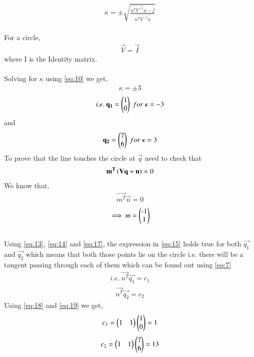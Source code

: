 \documentclass[journal,12pt,twocolumn]{IEEEtran}
\begin{document}
\begin{align}
\kappa = \pm \sqrt{\frac{\vec{u^TV^{-1}u}-f}{\vec{n^TV^{-1}n}}} \label{eq:10}
\end{align}\\
For a circle,
\begin{align}
\vec{V} = \vec{I} \label{eq:11}
\end{align}
where I is the Identity matrix.\\\\
Solving for $\kappa$ using \eqref{eq:10} we get,
\begin{align}
\kappa = \pm 3 \label{eq:12}
\end{align}
\begin{align}
i.e. \ \mathbf{q_1} = \begin{pmatrix}1 \\ 0\end{pmatrix} \ for \ \kappa = -3 \label{eq:13}
\end{align}
and
\begin{align}
\mathbf{q_2} = \begin{pmatrix}7 \\ 6\end{pmatrix} \ for \ \kappa = 3 \label{eq:14}
\end{align}
To prove that the line touches the circle at $\vec{q}$ need to check that
\begin{align}
\mathbf{m^T}\left(\mathbf{V}\mathbf{q}+\mathbf{u}\right) = 0 \label{eq:15}
\end{align}
We know that,
\begin{align}
\vec{m^T}\vec{n} = 0 \label{eq:16}
\end{align}
\begin{align}
\implies m = \myvec{$-$1 \\ 1} \label{eq:17} 
\end{align}\\
Using \eqref{eq:13}, \eqref{eq:14} and \eqref{eq:17}, the expression in \eqref{eq:15} holds true for both $\vec{q_1}$ and $\vec{q_2}$ which means that both those points lie on the circle i.e. there will be a tangent passing through each of them which can be found out using \eqref{eq:7}
\begin{align}
i.e. \ \vec{n^T}\vec{q_1} = c_1 \label{eq:18}
\end{align}
\begin{align}
\vec{n^T}\vec{q_2} = c_2 \label{eq:19}
\end{align}
Using \eqref{eq:18} and \eqref{eq:19} we get, 
\begin{align}
c_1 =  \begin{pmatrix}1 & 1\end{pmatrix}\begin{pmatrix}1 \\ 0\end{pmatrix} = 1 \label{eq:20}
\end{align}
\begin{align}
c_2 = \begin{pmatrix}1 & 1\end{pmatrix}\begin{pmatrix}7 \\ 6\end{pmatrix} = 13 \label{eq:21}
\end{align}
\end{document}
